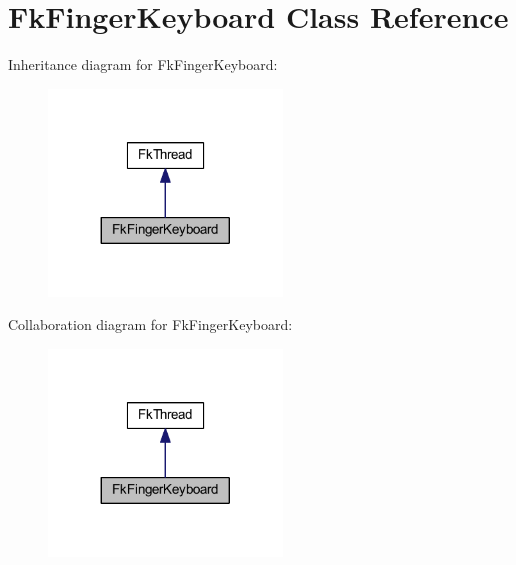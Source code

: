 \hypertarget{class_fk_finger_keyboard}{}\section{Fk\+Finger\+Keyboard Class Reference}
\label{class_fk_finger_keyboard}


Inheritance diagram for Fk\+Finger\+Keyboard\+:\nopagebreak
\begin{figure}[H]
\begin{center}
\leavevmode
\includegraphics[width=176pt]{class_fk_finger_keyboard__inherit__graph}
\end{center}
\end{figure}


Collaboration diagram for Fk\+Finger\+Keyboard\+:\nopagebreak
\begin{figure}[H]
\begin{center}
\leavevmode
\includegraphics[width=176pt]{class_fk_finger_keyboard__coll__graph}
\end{center}
\end{figure}
